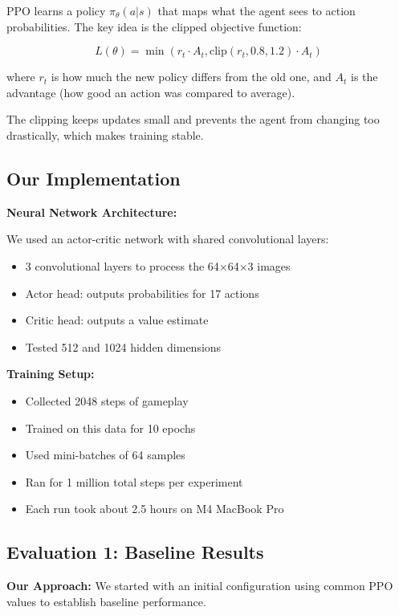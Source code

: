 \documentclass[conference]{IEEEtran}
\begin{document}
PPO learns a policy $\pi_\theta(a|s)$ that maps what the agent sees to action probabilities. The key idea is the clipped objective function:

\begin{equation}
L(\theta) = \min(r_t \cdot A_t, \text{clip}(r_t, 0.8, 1.2) \cdot A_t)
\end{equation}

where $r_t$ is how much the new policy differs from the old one, and $A_t$ is the advantage (how good an action was compared to average).

The clipping keeps updates small and prevents the agent from changing too drastically, which makes training stable.

\subsection{Our Implementation}

\textbf{Neural Network Architecture:}

We used an actor-critic network with shared convolutional layers:
\begin{itemize}
    \item 3 convolutional layers to process the 64×64×3 images
    \item Actor head: outputs probabilities for 17 actions
    \item Critic head: outputs a value estimate
    \item Tested 512 and 1024 hidden dimensions
\end{itemize}

\textbf{Training Setup:}
\begin{itemize}
    \item Collected 2048 steps of gameplay
    \item Trained on this data for 10 epochs
    \item Used mini-batches of 64 samples
    \item Ran for 1 million total steps per experiment
    \item Each run took about 2.5 hours on M4 MacBook Pro
\end{itemize}

\subsection{Evaluation 1: Baseline Results}

\textbf{Our Approach:} We started with an initial configuration using common PPO values to establish baseline performance.
\end{document}
